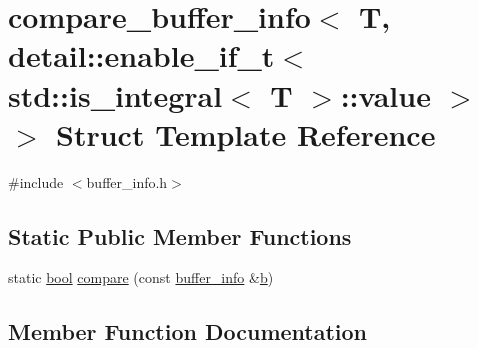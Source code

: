 \hypertarget{structcompare__buffer__info_3_01_t_00_01detail_1_1enable__if__t_3_01std_1_1is__integral_3_01_t_01_4_1_1value_01_4_01_4}{}\section{compare\+\_\+buffer\+\_\+info$<$ T, detail\+::enable\+\_\+if\+\_\+t$<$ std\+::is\+\_\+integral$<$ T $>$\+::value $>$ $>$ Struct Template Reference}
\label{structcompare__buffer__info_3_01_t_00_01detail_1_1enable__if__t_3_01std_1_1is__integral_3_01_t_01_4_1_1value_01_4_01_4}


{\ttfamily \#include $<$buffer\+\_\+info.\+h$>$}

\subsection*{Static Public Member Functions}
\begin{DoxyCompactItemize}
\item 
static \mbox{\hyperlink{asdl_8h_af6a258d8f3ee5206d682d799316314b1}{bool}} \mbox{\hyperlink{structcompare__buffer__info_3_01_t_00_01detail_1_1enable__if__t_3_01std_1_1is__integral_3_01_t_01_4_1_1value_01_4_01_4_a60fda70f2ae6e5cefd6854592482d4f2}{compare}} (const \mbox{\hyperlink{structbuffer__info}{buffer\+\_\+info}} \&\mbox{\hyperlink{_s_d_l__opengl__glext_8h_a0f71581a41fd2264c8944126dabbd010}{b}})
\end{DoxyCompactItemize}


\subsection{Member Function Documentation}
\mbox{\label{structcompare__buffer__info_3_01_t_00_01detail_1_1enable__if__t_3_01std_1_1is__integral_3_01_t_01_4_1_1value_01_4_01_4_a60fda70f2ae6e5cefd6854592482d4f2}} 
